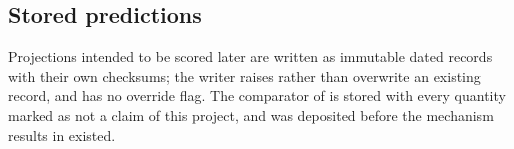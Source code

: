 \subsection*{Stored predictions}

Projections intended to be scored later are written as immutable dated records
with their own checksums; the writer raises rather than overwrite an existing
record, and has no override flag. The comparator of  is
stored with every quantity marked as not a claim of this project, and was
deposited before the mechanism results in  existed.
